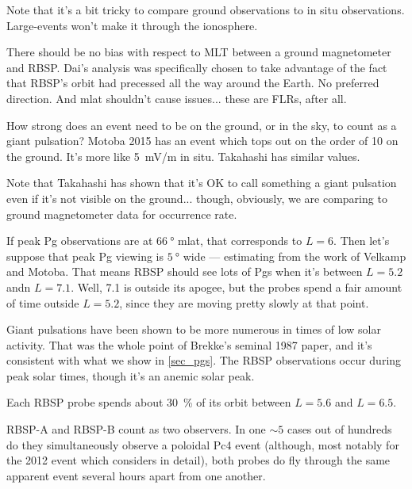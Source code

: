
Note that it's a bit tricky to compare ground observations to in situ observations. Large-\azm events won't make it through the ionosphere. 

There should be no bias with respect to MLT between a ground magnetometer and RBSP. Dai's analysis was specifically chosen to take advantage of the fact that RBSP's orbit had precessed all the way around the Earth. No preferred direction. And mlat shouldn't cause issues... these are FLRs, after all. 

How strong does an event need to be on the ground, or in the sky, to count as a giant pulsation? Motoba 2015\cite{motoba_2015} has an event which tops out on the order of \SI{10}{\nT} on the ground. It's more like \SI{5}{\mV/\m} in situ. Takahashi\cite{takahashi_2011} has similar values. 

Note that Takahashi\cite{takahashi_2013} has shown that it's OK to call something a giant pulsation even if it's not visible on the ground... though, obviously, we are comparing to ground magnetometer data for occurrence rate. 

If peak Pg observations are at $\SI{66}{\degree}$ mlat, that corresponds to $L = 6$. Then let's suppose that peak Pg viewing is $\SI{5}{\degree}$ wide --- estimating from the work of Velkamp and Motoba. That means RBSP should see lots of Pgs when it's between $L = 5.2$ andn $L = 7.1$. Well, \SI{7.1}{\RE} is outside its apogee, but the probes spend a fair amount of time outside $L = 5.2$, since they are moving pretty slowly at that point. 

Giant pulsations have been shown to be more numerous in times of low solar activity. That was the whole point of Brekke's seminal 1987 paper, and it's consistent with what we show in \cref{sec_pgs}. The RBSP observations occur during peak solar times, though it's an anemic solar peak\cite{pesnell_2016}. 


Each RBSP probe spends about \SI{30}{\percent} of its orbit between $L = 5.6$ and $L = 6.5$. 

RBSP-A and RBSP-B count as two observers. In one $\sim 5$ cases out of hundreds do they simultaneously observe a poloidal Pc4 event (although, most notably for the 2012 event which \cite{dai_2013} considers in detail), both probes do fly through the same apparent event several hours apart from one another. 

